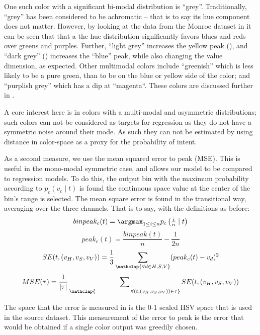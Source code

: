


One such color with a significant bi-modal distribution is ``grey''.
Traditionally, ``grey'' has been considered to be achromatic -- that is to say its hue component does not matter.
However, by looking at the data from the Monroe dataset \parencite{Monroe2010XKCDdataset} in  it can be seen that that a the hue distribution significantly favors blues and reds over greens and purples.
Further, ``light grey'' increases the yellow peak (), and ``dark grey'' () increases the ``blue'' peak, while also changing the value dimension, as expected.
Other multimodal colors include ``greenish'' which is less likely to be a pure green, than to be on the blue or yellow side of the color; 
and ``purplish grey'' which has a dip at ``magenta``.
These colors are discussed further in .

A core interest here is in colors with a multi-modal and asymmetric distributions; such colors can not be considered as targets for regression as they do not have a symmetric noise around their mode.
As such they can not be estimated by using distance in color-space as a proxy for the probability of intent.




As a second measure, we use the mean squared error to peak (MSE).
This is useful in the mono-modal symmetric case, and allows our model to be compared to regression models.
To do this, the output bin with the maximum probability according to $p_c(v_c\mid t)$ is found the continuous space value at the center of the bin's range is selected.
The mean square error is found in the transitional way, averaging over the three channels.
That is to say, with the definitions as before:
\[
binpeak_c(t)=\argmax_{1\le i \le n}{p_c\left(\tfrac{i}{n} \mid t\right)}
\]
\[
peak_c(t)=\frac{binpeak(t)}{n} - \frac{1}{2n}
\]
\[
SE(t, (v_{H}, v_{S}, v_{V})) = \frac{1}{3}
	\sum_{\mathclap{\forall d\in{H,S,V}}} (peak_c(t) - v_d)^2
\]
\[
MSE(\tau) =\frac{1}{|\tau|}
	\sum_{\mathclap{\qquad\qquad\quad
		\forall(t,(v_{H}, v_{S}, v_{V})) \in \tau}}
	 SE(t,(v_{H}, v_{S}, v_{V}))
\]

The space that the error is measured in is the 0-1 scaled HSV space that is used in the source dataset.
This measurement of the error to peak is the error that would be obtained if a single color output was greedily chosen.
